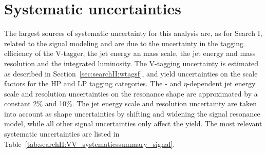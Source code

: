 \section{Systematic uncertainties}
The largest sources of systematic uncertainty for this analysis are, as for Search I, related to the signal modeling and are due to the uncertainty in the tagging efficiency of the V-tagger, the jet energy an mass scale, the jet energy and mass resolution and the integrated luminosity. The V-tagging uncertainty is estimated as described in Section~\ref{sec:searchII:wtagsf}, and yield uncertainties on the scale factors for the HP and LP tagging categories.
The \pt- and $\eta$-dependent jet energy scale and resolution uncertainties on the resonance shape are approximated by a constant 2\% and 10\%. The jet energy scale and resolution uncertainty are taken into account as shape uncertainties by shifting and widening the signal resonance model,
while all other signal uncertainties only affect the yield. The most relevant systematic uncertainties are listed in Table~\ref{tab:searchII:VV_systematicssummary_signal}.
